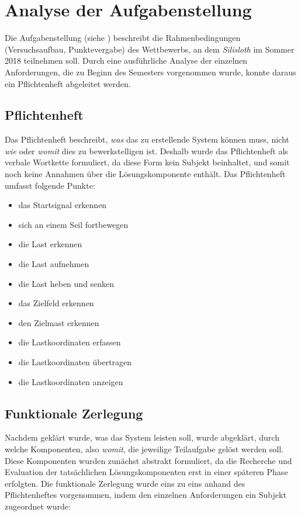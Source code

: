 \section{Analyse der Aufgabenstellung}
\label{sec:analyse-aufgabenstellung}

Die Aufgabenstellung (siehe ) beschreibt die Rahmenbedingungen (Versuchsaufbau, Punktevergabe) des Wettbewerbs, an dem \textit{Silisloth} im Sommer 2018 teilnehmen soll. Durch eine ausführliche Analyse der einzelnen Anforderungen, die zu Beginn des Semesters vorgenommen wurde, konnte daraus ein Pflichtenheft abgeleitet werden.

\subsection{Pflichtenheft}

Das Pflichtenheft beschreibt, \textit{was} das zu erstellende System können muss, nicht \textit{wie} oder \textit{womit} dies zu bewerkstelligen ist. Deshalb wurde das Pflichtenheft als verbale Wortkette formuliert, da diese Form kein Subjekt beinhaltet, und somit noch keine Annahmen über die Lösungskomponente enthält. Das Pflichtenheft umfasst folgende Punkte:

\begin{multicols}{2}
\begin{itemize}[leftmargin=*]
\setlength\itemsep{0.2em}
\item das Startsignal erkennen
\item sich an einem Seil fortbewegen
\item die Last erkennen
\item die Last aufnehmen
\item die Last heben und senken
\item das Zielfeld erkennen
\item den Zielmast erkennen
\item die Lastkoordinaten erfassen
\item die Lastkoordinaten übertragen
\item die Lastkoordinaten anzeigen
\end{itemize}
\end{multicols}

\subsection{Funktionale Zerlegung}

Nachdem geklärt wurde, was das System leisten soll, wurde abgeklärt, durch welche Komponenten, also \textit{womit}, die jeweilige Teilaufgabe gelöst werden soll. Diese Komponenten wurden zunächst abstrakt formuliert, da die Recherche und Evaluation der tatsächlichen Lösungskomponenten erst in einer späteren Phase erfolgten. Die funktionale Zerlegung wurde eins zu eins anhand des Pflichtenheftes vorgenommen, indem den einzelnen Anforderungen ein Subjekt zugeordnet wurde:

